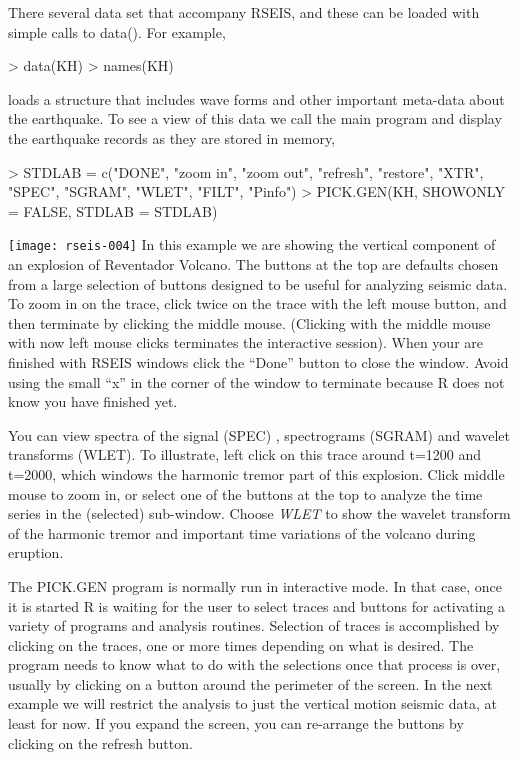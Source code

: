 \documentclass{article}
\begin{document}
There several data set that accompany RSEIS,
and these can be loaded with simple calls to data().
For example,
\begin{Schunk}
\begin{Sinput}
> data(KH)
> names(KH)
\end{Sinput}
\end{Schunk}
loads a structure that includes wave forms and other important
meta-data about the earthquake.  To see a view of this data
we call the main program and display the earthquake records as they are stored
in memory,


\begin{Schunk}
\begin{Sinput}
> STDLAB = c("DONE", "zoom in", "zoom out", "refresh", "restore", 
     "XTR", "SPEC", "SGRAM", "WLET", "FILT", "Pinfo")
> PICK.GEN(KH, SHOWONLY = FALSE, STDLAB = STDLAB)
\end{Sinput}
\end{Schunk}
\texttt{[image: rseis-004]}
In this example we are showing the vertical component of an explosion 
of Reventador Volcano.  The buttons at the top
are defaults chosen from a large selection of 
buttons designed to be useful for analyzing seismic data.
To zoom in on the trace, click twice on the trace with the left mouse button,
and then terminate by clicking the middle mouse.
(Clicking with the middle mouse with now left mouse clicks terminates the interactive session).
When your are finished with RSEIS windows click the ``Done'' 
button to close the window.  Avoid using the small
``x'' in the corner of the window to terminate because
R does not know you have finished yet.

You can view spectra of the signal (SPEC) , spectrograms (SGRAM) 
and wavelet transforms (WLET). To illustrate,
left click on this trace around t=1200 and t=2000, which 
windows the harmonic tremor part of this explosion.
Click middle mouse to zoom in, or
select one of the buttons at
the top to analyze the time series in the (selected) sub-window.
Choose  \emph{WLET} to show the wavelet transform of
the harmonic tremor and important time variations of the
volcano during eruption.

The PICK.GEN program is normally run in interactive mode.
In that case, once it is started R is waiting for
the user to select traces and buttons for
activating a variety of programs and analysis 
routines.
Selection of traces is accomplished by clicking on the traces,
one or more times depending 
on what is desired.
The program needs to know what to do with the 
selections once that process is over, 
usually by clicking on a button around the perimeter 
of the screen.  In the next example we will restrict the analysis
to just the vertical motion seismic data, at least for now.
If you expand the screen, you can re-arrange the buttons by
clicking on the refresh button.
\end{document}

